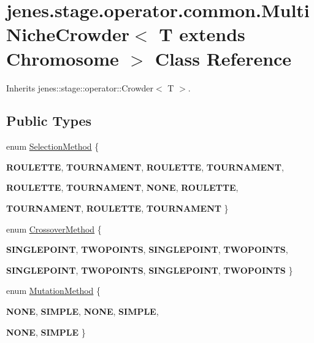 \hypertarget{classjenes_1_1stage_1_1operator_1_1common_1_1_multi_niche_crowder_3_01_t_01extends_01_chromosome_01_4}{
\section{jenes.stage.operator.common.MultiNicheCrowder$<$ T extends Chromosome $>$ Class Reference}
\label{classjenes_1_1stage_1_1operator_1_1common_1_1_multi_niche_crowder_3_01_t_01extends_01_chromosome_01_4}
}
Inherits jenes::stage::operator::Crowder$<$ T $>$.

\subsection*{Public Types}
\begin{CompactItemize}
\item 
enum \hyperlink{classjenes_1_1stage_1_1operator_1_1common_1_1_multi_niche_crowder_3_01_t_01extends_01_chromosome_01_4_1190dbbe875b99f6679f7b5deb68483b}{SelectionMethod} \{ \par
\textbf{ROULETTE}, 
\textbf{TOURNAMENT}, 
\textbf{ROULETTE}, 
\textbf{TOURNAMENT}, 
\par
\textbf{ROULETTE}, 
\textbf{TOURNAMENT}, 
\textbf{NONE}, 
\textbf{ROULETTE}, 
\par
\textbf{TOURNAMENT}, 
\textbf{ROULETTE}, 
\textbf{TOURNAMENT}
 \}
\item 
enum \hyperlink{classjenes_1_1stage_1_1operator_1_1common_1_1_multi_niche_crowder_3_01_t_01extends_01_chromosome_01_4_273881bd444aeae8ef77816000eac94c}{CrossoverMethod} \{ \par
\textbf{SINGLEPOINT}, 
\textbf{TWOPOINTS}, 
\textbf{SINGLEPOINT}, 
\textbf{TWOPOINTS}, 
\par
\textbf{SINGLEPOINT}, 
\textbf{TWOPOINTS}, 
\textbf{SINGLEPOINT}, 
\textbf{TWOPOINTS}
 \}
\item 
enum \hyperlink{classjenes_1_1stage_1_1operator_1_1common_1_1_multi_niche_crowder_3_01_t_01extends_01_chromosome_01_4_1ea23e3abc5ae7417a422840824bab65}{MutationMethod} \{ \par
\textbf{NONE}, 
\textbf{SIMPLE}, 
\textbf{NONE}, 
\textbf{SIMPLE}, 
\par
\textbf{NONE}, 
\textbf{SIMPLE}
 \}
\end{CompactItemize}
